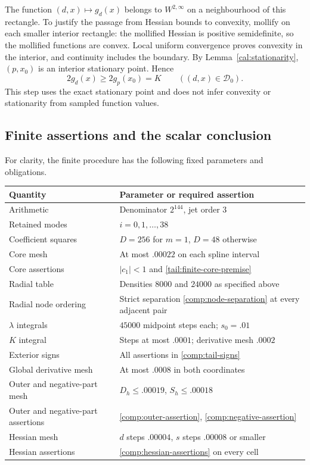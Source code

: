 The function $(d,x)\mapsto g_d(x)$ belongs to
$W^{2,\infty}$ on a neighbourhood of this rectangle.  To justify
the passage from Hessian bounds to convexity, mollify on each
smaller interior rectangle: the mollified Hessian is positive
semidefinite, so the mollified functions are convex.  Local
uniform convergence proves convexity in the interior, and
continuity includes the boundary.  By
Lemma~\ref{cal:stationarity}, $(p,x_0)$ is an interior stationary
point.  Hence
\begin{equation}\label{comp:inner-conclusion}
          2g_d(x)\ge2g_p(x_0)=K\qquad((d,x)\in\mathcal D_0).
\end{equation}
This step uses the exact stationary point and does not infer
convexity or stationarity from sampled function values.

\subsection{Finite assertions and the scalar conclusion}
\label{comp:conclusion}

For clarity, the finite procedure has the following fixed
parameters and obligations.
\begin{center}
\begin{tabular}{ll}
\hline
Quantity & Parameter or required assertion\\
\hline
Arithmetic & Denominator $2^{144}$, jet order $3$\\
Retained modes & $i=0,1,\ldots,38$\\
Coefficient squares & $D=256$ for $m=1$, $D=48$ otherwise\\
Core mesh & At most $.00022$ on each spline interval\\
Core assertions & $|c_1|<1$ and \eqref{tail:finite-core-premise}\\
Radial table & Densities $8000$ and $24000$ as specified above\\
Radial node ordering & Strict separation \eqref{comp:node-separation}
                       at every adjacent pair\\
$\lambda$ integrals & $45000$ midpoint steps each; $s_0=.01$\\
$K$ integral & Steps at most $.0001$; derivative mesh $.0002$\\
Exterior signs & All assertions in \eqref{comp:tail-signs}\\
Global derivative mesh & At most $.0008$ in both coordinates\\
Outer and negative-part mesh & $D_h\le.00019$, $S_h\le.00018$\\
Outer and negative-part assertions & \eqref{comp:outer-assertion},
                                      \eqref{comp:negative-assertion}\\
Hessian mesh & $d$ steps $.00004$, $s$ steps $.00008$ or smaller\\
Hessian assertions & \eqref{comp:hessian-assertions} on every cell\\
\hline
\end{tabular}
\end{center}


